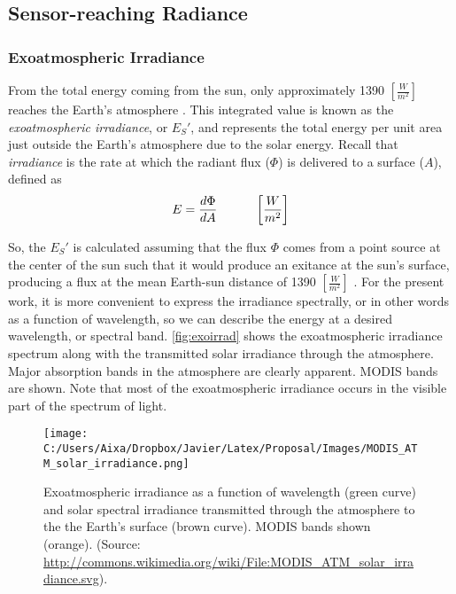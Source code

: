 \subsection{Sensor-reaching Radiance}

\subsubsection{Exoatmospheric Irradiance}

From the total energy coming from the sun, only approximately 1390 $\left[\frac{W}{m^2}\right]$ reaches the Earth's atmosphere \cite{Schott}. This integrated value is known as the \emph{exoatmospheric irradiance}, or $E_S'$, and represents the total energy per unit area just outside the Earth's atmosphere due to the solar energy. Recall that \emph{irradiance} is the rate at which the radiant flux ($\Phi$) is delivered to a surface ($A$), defined as
\begin{equation} \label{eq:irradiance}
E = \frac{d\Phi}{dA}   \indent   \indent  \left[\frac{W}{m^2}\right]  
\end{equation} 

So, the $E_S'$ is calculated assuming that the flux $\Phi$ comes from a point source at the center of the sun such that it would produce an exitance at the sun's surface, producing a flux at the mean Earth-sun distance of 1390 $\left[\frac{W}{m^2}\right]$ . For the present work, it is more convenient to express the irradiance spectrally, or in other words as a function of wavelength, so we can describe the energy at a desired wavelength, or spectral band. \autoref{fig:exoirrad} shows the exoatmospheric irradiance spectrum  along with the transmitted solar irradiance through the atmosphere. Major absorption bands in the atmosphere are clearly apparent. MODIS bands are shown. Note that most of the exoatmospheric irradiance occurs in the visible part of the spectrum of light.

\begin{figure}[htb]
  \centering
  \texttt{[image: C:/Users/Aixa/Dropbox/Javier/Latex/Proposal/Images/MODIS\_ATM\_solar\_irradiance.png]}
\caption{Exoatmospheric irradiance as a function of wavelength (green curve) and solar spectral irradiance transmitted through the  atmosphere to the the Earth's surface (brown curve). MODIS bands shown (orange).  (Source: \protect\url{http://commons.wikimedia.org/wiki/File:MODIS_ATM_solar_irradiance.svg}).}
\label{fig:exoirrad} 
\end{figure}

